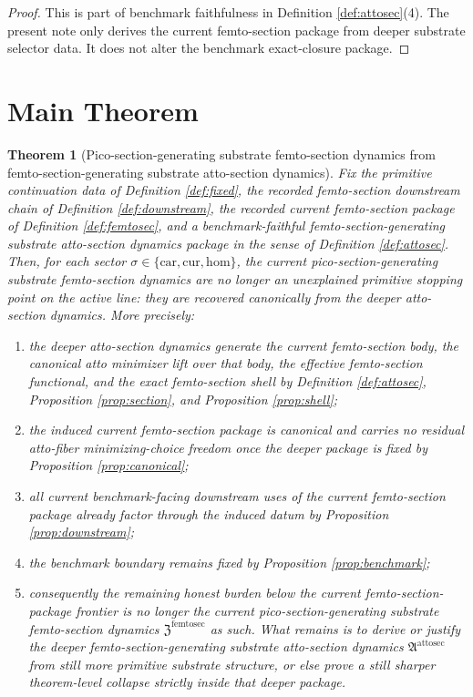 \documentclass[11pt]{article}
\newcommand{\Car}{\mathrm{car}}
\newcommand{\Cur}{\mathrm{cur}}
\newcommand{\Hom}{\mathrm{hom}}
\newcommand{\FemtoSectionPackage}{\mathfrak Z^{\mathrm{femtosec}}}
\newcommand{\AttoSectionPackage}{\mathfrak A^{\mathrm{attosec}}}
\newtheorem{theorem}{Theorem}
\begin{document}
\begin{proof}
This is part of benchmark faithfulness in Definition \ref{def:attosec}(4). The present note only derives the current femto-section package from deeper substrate selector data. It does not alter the benchmark exact-closure package.
\end{proof}

\section{Main Theorem}

\begin{theorem}[Pico-section-generating substrate femto-section dynamics from femto-section-generating substrate atto-section dynamics]
\label{thm:main}
Fix the primitive continuation data of Definition \ref{def:fixed}, the recorded femto-section downstream chain of Definition \ref{def:downstream}, the recorded current femto-section package of Definition \ref{def:femtosec}, and a benchmark-faithful femto-section-generating substrate atto-section dynamics package in the sense of Definition \ref{def:attosec}. Then, for each sector \(\sigma\in\{\Car,\Cur,\Hom\}\), the current pico-section-generating substrate femto-section dynamics are no longer an unexplained primitive stopping point on the active line: they are recovered canonically from the deeper atto-section dynamics. More precisely:
\begin{enumerate}
    \item the deeper atto-section dynamics generate the current femto-section body, the canonical atto minimizer lift over that body, the effective femto-section functional, and the exact femto-section shell by Definition \ref{def:attosec}, Proposition \ref{prop:section}, and Proposition \ref{prop:shell};
    \item the induced current femto-section package is canonical and carries no residual atto-fiber minimizing-choice freedom once the deeper package is fixed by Proposition \ref{prop:canonical};
    \item all current benchmark-facing downstream uses of the current femto-section package already factor through the induced datum by Proposition \ref{prop:downstream};
    \item the benchmark boundary remains fixed by Proposition \ref{prop:benchmark};
    \item consequently the remaining honest burden below the current femto-section-package frontier is no longer the current pico-section-generating substrate femto-section dynamics \(\FemtoSectionPackage\) as such. What remains is to derive or justify the deeper femto-section-generating substrate atto-section dynamics \(\AttoSectionPackage\) from still more primitive substrate structure, or else prove a still sharper theorem-level collapse strictly inside that deeper package.
\end{enumerate}
\end{theorem}
\end{document}
